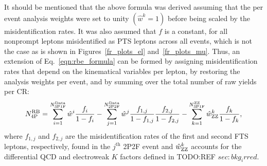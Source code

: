 It should be mentioned that the above formula was derived assuming that the per event analysis weights were set to unity $\left( \hat{w}^k = 1 \right)$ before being scaled by the misidentification rates.
It was also assumed that $f$ is a constant, for all nonprompt leptons misidentified as PTS leptons across all events, which is not the case as is shown in Figures~\ref{fr_plots_el} and~\ref{fr_plots_mu}.
Thus, an extension of Eq.~\ref{eqn:rbe_formula} can be formed by assigning misidentification rates that depend on the kinematical variables per lepton,
by restoring the analysis weights per event,
and by summing over the total number of raw yields per CR:
\begin{equation}
	\label{eqn:rbe_formula_final}
	N_\text{4P}^\text{RB} =
	  \sum_{i=1}^{N_{\text{3P1F}}^\text{Data}} \hat{w}^i \frac{f_i}{1 - f_i}
	- \sum_{j=1}^{N_{\text{2P2F}}^\text{Data}} \hat{w}^j \frac{f_{1,j}}{1 - f_{1,j}}\frac{f_{2,j}}{1 - f_{2,j}}
	- \sum_{k=1}^{N_{\text{3P1F}}^{\mathrm{Z}\mathrm{Z}}} \hat{w}^{k}_{\mathrm{Z}\mathrm{Z}} \frac{f_k}{1 - f_k},
\end{equation}
where $f_{1,j}$ and $f_{2,j}$ are the misidentification rates of the first and second FTS leptons, respectively, found in the $j^{\text{th}}$ 2P2F event
and $\hat{w}^k_{\mathrm{Z}\mathrm{Z}}$ accounts for the differential QCD and electroweak $K$ factors defined in TODO:REF $sec:bkg_irred$. %
